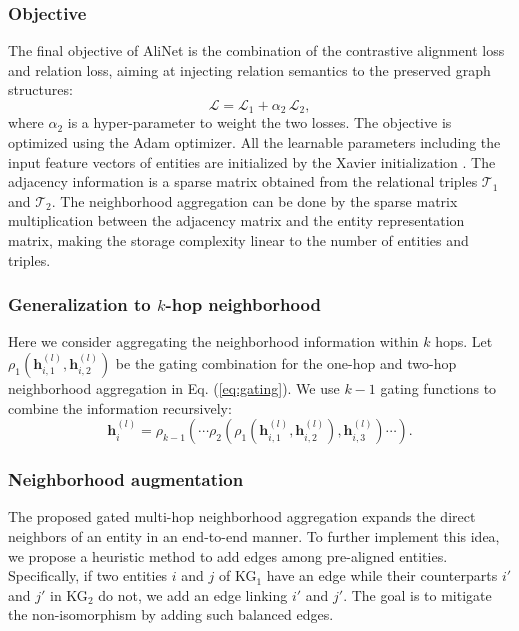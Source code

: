 \documentclass[letterpaper]{article} \usepackage{aaai20}  \usepackage{times}  \usepackage{helvet} \usepackage{courier}  \usepackage[hyphens]{url}  \usepackage{graphicx} \urlstyle{rm} \def\UrlFont{\rm}  \frenchspacing  \setlength{\pdfpagewidth}{8.5in}  \setlength{\pdfpageheight}{11in}  \usepackage{amsmath}
\begin{document}
\subsubsection{Objective}
The final objective of AliNet is the combination of the contrastive alignment loss and relation loss, aiming at injecting relation semantics to the preserved graph structures:
\begin{equation} 
	\label{eq:loss}
	\mathcal{L} = \mathcal{L}_1 + \alpha_2 \, \mathcal{L}_2,
\end{equation}
where $\alpha_2$ is a hyper-parameter to weight the two losses. The objective is optimized using the Adam optimizer. All the learnable parameters including the input feature vectors of entities are initialized by the Xavier initialization \cite{Xavier}. The adjacency information is a sparse matrix obtained from the relational triples $\mathcal{T}_1$ and $\mathcal{T}_2$. The neighborhood aggregation can be done by the sparse matrix multiplication between the adjacency matrix and the entity representation matrix, making the storage complexity linear to the number of entities and triples. 

\subsubsection{Generalization to $k$-hop neighborhood} 
Here we consider aggregating the neighborhood information within $k$ hops. Let $\rho_1(\mathbf{h}_{i,1}^{(l)},\mathbf{h}_{i,2}^{(l)})$ be the gating combination for the one-hop and two-hop neighborhood aggregation in Eq. (\ref{eq:gating}). We use $k-1$ gating functions to combine the information recursively:
\begin{equation} 
\label{eq:gating_k}
\mathbf{h}_{i}^{(l)} = \rho_{k-1}(\cdots\rho_2(\rho_1(\mathbf{h}_{i,1}^{(l)},\mathbf{h}_{i,2}^{(l)}),\mathbf{h}_{i,3}^{(l)})\cdots).
\end{equation}

\subsubsection{Neighborhood augmentation} 
The proposed gated multi-hop neighborhood aggregation expands the direct neighbors of an entity in an end-to-end manner. To further implement this idea, we propose a heuristic method to add edges among pre-aligned entities. Specifically, if two entities $i$ and $j$ of KG$_1$ have an edge while their counterparts $i'$ and $j'$ in KG$_2$ do not, we add an edge linking $i'$ and $j'$. The goal is to mitigate the non-isomorphism by adding such balanced edges.
\end{document}
